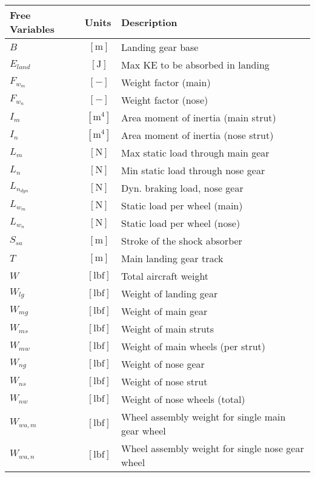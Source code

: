 % 

{\footnotesize
\begin{supertabular}{lcl}
\toprule
Free Variables & Units & Description \\ \midrule
$B$ & $~\mathrm{[m]}$ & Landing gear base \\
$E_{land}$ & $~\mathrm{[J]}$ & Max KE to be absorbed in landing \\
$F_{w_m}$ & $~[-]$ & Weight factor (main) \\
$F_{w_n}$ & $~[-]$ & Weight factor (nose) \\
$I_m$ & $~\mathrm{[m^{4}]}$ & Area moment of inertia (main strut) \\
$I_n$ & $~\mathrm{[m^{4}]}$ & Area moment of inertia (nose strut) \\
$L_m$ & $~\mathrm{[N]}$ & Max static load through main gear \\
$L_n$ & $~\mathrm{[N]}$ & Min static load through nose gear \\
$L_{n_{dyn}}$ & $~\mathrm{[N]}$ & Dyn. braking load, nose gear \\
$L_{w_m}$ & $~\mathrm{[N]}$ & Static load per wheel (main) \\
$L_{w_n}$ & $~\mathrm{[N]}$ & Static load per wheel (nose) \\
$S_{sa}$ & $~\mathrm{[m]}$ & Stroke of the shock absorber \\
$T$ & $~\mathrm{[m]}$ & Main landing gear track \\
$W$ & $~\mathrm{[lbf]}$ & Total aircraft weight \\
$W_{lg}$ & $~\mathrm{[lbf]}$ & Weight of landing gear \\
$W_{mg}$ & $~\mathrm{[lbf]}$ & Weight of main gear \\
$W_{ms}$ & $~\mathrm{[lbf]}$ & Weight of main struts \\
$W_{mw}$ & $~\mathrm{[lbf]}$ & Weight of main wheels (per strut) \\
$W_{ng}$ & $~\mathrm{[lbf]}$ & Weight of nose gear \\
$W_{ns}$ & $~\mathrm{[lbf]}$ & Weight of nose strut \\
$W_{nw}$ & $~\mathrm{[lbf]}$ & Weight of nose wheels (total) \\
$W_{wa,m}$ & $~\mathrm{[lbf]}$ & Wheel assembly weight for single main gear wheel \\
$W_{wa,n}$ & $~\mathrm{[lbf]}$ & Wheel assembly weight for single nose gear wheel \\

\end{supertabular}}
